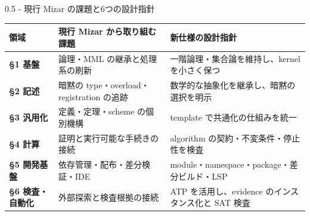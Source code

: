 \documentclass[dvipdfmx,aspectratio=169,11pt]{beamer}
\begin{document}
\begin{frame}[fragile,t]{0.5 - 現行 Mizar の課題と6つの設計指針}
\par{}
\begin{small}
\setlength{\tabcolsep}{3pt}
\renewcommand{\arraystretch}{1.5}
\begin{tabularx}{\textwidth}{l>{\raggedright\arraybackslash}X>{\raggedright\arraybackslash}X}
\toprule
\textbf{領域} & \textbf{現行 Mizar から取り組む課題} & \textbf{新仕様の設計指針} \\
\midrule
\textcolor{blue!55!black}{\textbf{§1 基盤}} & 論理・MML の継承と処理系の刷新 & 一階論理・集合論を維持し、kernel を小さく保つ \\
\textcolor{blue!55!black}{\textbf{§2 記述}} & 暗黙の type・overload・registration の追跡 & 数学的な抽象化を継承し、暗黙の選択を明示 \\
\textcolor{blue!55!black}{\textbf{§3 汎用化}} & 定義・定理・scheme の個別機構 & template で共通化の仕組みを統一 \\
\textcolor{blue!55!black}{\textbf{§4 計算}} & 証明と実行可能な手続きの接続 & algorithm の契約・不変条件・停止性を検査 \\
\textcolor{blue!55!black}{\textbf{§5 開発基盤}} & 依存管理・配布・差分検証・IDE & module・namespace・package・差分ビルド・LSP \\
\textcolor{blue!55!black}{\textbf{§6 検査・自動化}} & 外部探索と検査根拠の接続 & ATP を活用し、evidence のインスタンス化と SAT 検査 \\
\bottomrule
\end{tabularx}
\end{small}

\end{frame}
\end{document}
